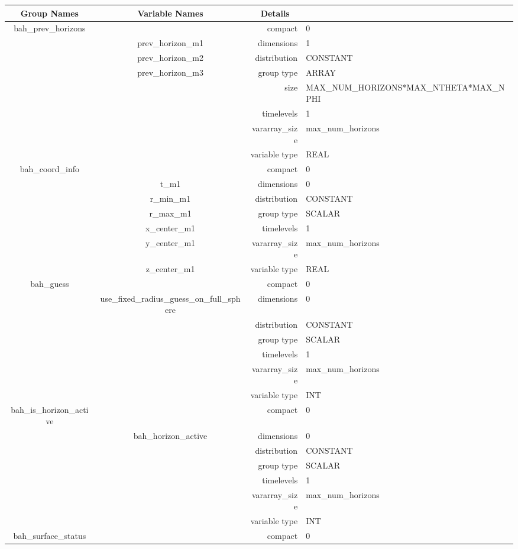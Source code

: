 \documentclass[a4paper,11pt]{article}
\begin{document}
\begin{tabular*}{150mm}{|c|c@{\extracolsep{\fill}}|rl|} \hline 
~ {\bf Group Names} ~ & ~ {\bf Variable Names} ~  &{\bf Details} ~ & ~\\ 
\hline 
bah\_prev\_horizons &  & compact & 0 \\ 
 & prev\_horizon\_m1 & dimensions & 1 \\ 
 & prev\_horizon\_m2 & distribution & CONSTANT \\ 
 & prev\_horizon\_m3 & group type & ARRAY \\ 
 &  & size & MAX\_NUM\_HORIZONS*MAX\_NTHETA*MAX\_NPHI \\ 
 &  & timelevels & 1 \\ 
 &  & vararray\_size & max\_num\_horizons \\ 
 &  & variable type & REAL \\ 
\hline 
bah\_coord\_info &  & compact & 0 \\ 
 & t\_m1 & dimensions & 0 \\ 
 & r\_min\_m1 & distribution & CONSTANT \\ 
 & r\_max\_m1 & group type & SCALAR \\ 
 & x\_center\_m1 & timelevels & 1 \\ 
 & y\_center\_m1 & vararray\_size & max\_num\_horizons \\ 
 & z\_center\_m1 & variable type & REAL \\ 
\hline 
bah\_guess &  & compact & 0 \\ 
 & use\_fixed\_radius\_guess\_on\_full\_sphere & dimensions & 0 \\ 
 &  & distribution & CONSTANT \\ 
 &  & group type & SCALAR \\ 
 &  & timelevels & 1 \\ 
 &  & vararray\_size & max\_num\_horizons \\ 
 &  & variable type & INT \\ 
\hline 
bah\_is\_horizon\_active &  & compact & 0 \\ 
 & bah\_horizon\_active & dimensions & 0 \\ 
 &  & distribution & CONSTANT \\ 
 &  & group type & SCALAR \\ 
 &  & timelevels & 1 \\ 
 &  & vararray\_size & max\_num\_horizons \\ 
 &  & variable type & INT \\ 
\hline 
bah\_surface\_status &  & compact & 0 \\ 

\end{tabular*}
\end{document}
